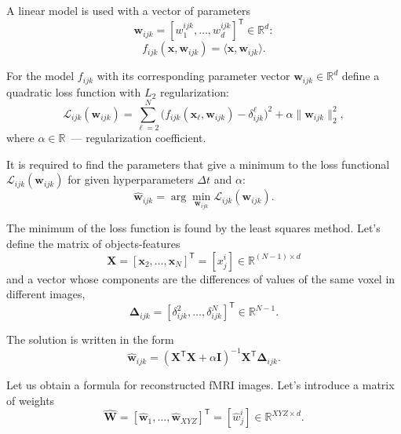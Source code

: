 \documentclass[sn-mathphys-num]{sn-jnl}%
\theoremstyle{thmstyleone}%
\theoremstyle{thmstyletwo}%
\theoremstyle{thmstylethree}%
\newcommand{\T}{^{\mathsf{T}}}
\begin{document}
A linear model is used with a vector of parameters
\[ \mathbf{w}_{ijk} = [w^{ijk}_1, \ldots, w^{ijk}_{d}]\T \in \mathbb{R}^{d}: \]
\begin{equation*}
	\label{eq7}
	f_{ijk}(\mathbf{x}, \mathbf{w}_{ijk}) = \langle \mathbf{x}, \mathbf{w}_{ijk} \rangle.
\end{equation*}

For the model $f_{ijk}$ with its corresponding parameter vector $\mathbf{w}_{ijk} \in \mathbb{R}^{d}$ define a quadratic loss function with $L_2$ regularization:
\begin{equation*}
	\label{eq8}
	\mathcal{L}_{ijk}(\mathbf{w}_{ijk}) = \sum\limits_{\ell = 2}^{N} \big(f_{ijk}(\mathbf{x}_{\ell}, \mathbf{w}_{ijk}) - \delta^{\ell}_{ijk}\big)^2 + \alpha \| \mathbf{w}_{ijk} \|_2^2,
\end{equation*}
where $\alpha \in \mathbb{R}$~--- regularization coefficient.

It is required to find the parameters that give a minimum to the loss functional $\mathcal{L}_{ijk}(\mathbf{w}_{ijk})$ for given hyperparameters $\Delta t$ and $\alpha$:
\begin{equation*}
	\label{eq9}
	\hat{\mathbf{w}}_{ijk} = \arg\min_{\mathbf{w}_{ijk}} \mathcal{L}_{ijk}(\mathbf{w}_{ijk}).
\end{equation*}

The minimum of the loss function is found by the least squares method. Let's define the matrix of objects-features
\begin{equation*}
	\label{eq10}
	\mathbf{X} = [\mathbf{x}_2, \ldots, \mathbf{x}_N]\T = [x^i_j] \in \mathbb{R}^{(N-1) \times d}
\end{equation*}
and a vector whose components are the differences of values of the same voxel in different images,
\begin{equation*}
	\label{eq11}
	\mathbf{\Delta}_{ijk} = [\delta^2_{ijk}, \ldots, \delta^N_{ijk}]\T \in \mathbb{R}^{N-1}.
\end{equation*}

The solution is written in the form
\begin{equation*}
	\label{eq12}
	\hat{\mathbf{w}}_{ijk} = (\mathbf{X}\T \mathbf{X} + \alpha \mathbf{I})^{-1} \mathbf{X}\T \mathbf{\Delta}_{ijk}.
\end{equation*}

Let us obtain a formula for reconstructed fMRI images. Let's introduce a matrix of weights
\begin{equation*}
	\label{eq13}
	\hat{\mathbf{W}} = [\hat{\mathbf{w}}_1, \ldots, \hat{\mathbf{w}}_{XYZ}]\T = [\hat{w}^i_j] \in \mathbb{R}^{XYZ \times d}.
\end{equation*}
\end{document}
